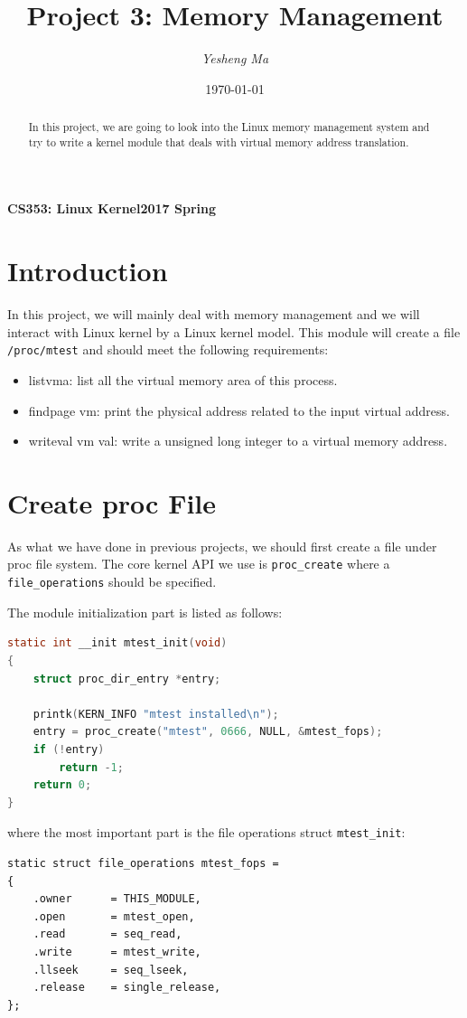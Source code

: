 \documentclass{article}
\begin{document}
\title{Project 3: Memory Management}
\author{\textit{Yesheng Ma}}
\date{\today}
{\bf\small CS353: Linux Kernel}\hfill{\bf\small 2017 Spring}
{\let\newpage\relax\maketitle}
\maketitle


\begin{abstract}
In this project, we are going to look into the Linux memory management system and try to write a kernel module that deals with virtual memory address translation.
\end{abstract}


\section{Introduction}
In this project, we will mainly deal with memory management and we will interact with Linux kernel by a Linux kernel model. This module will create a file \texttt{/proc/mtest} and should meet the following requirements:
\begin{itemize}
\item listvma: list all the virtual memory area of this process.
\item findpage vm: print the physical address related to the input virtual address.
\item writeval vm val: write a unsigned long integer to a virtual memory address.
\end{itemize}

\section{Create proc File}
As what we have done in previous projects, we should first create a file under proc file system. The core kernel API we use is \verb|proc_create| where a \texttt{file\_operations} should be specified.

The module initialization part is listed as follows:
\begin{lstlisting}[language=C]
static int __init mtest_init(void)
{
	struct proc_dir_entry *entry;

	printk(KERN_INFO "mtest installed\n");
	entry = proc_create("mtest", 0666, NULL, &mtest_fops);
	if (!entry)
		return -1;
	return 0;
}
\end{lstlisting}
where the most important part is the file operations struct \verb|mtest_init|:
\begin{lstlisting}
static struct file_operations mtest_fops =
{
	.owner		= THIS_MODULE,
	.open		= mtest_open,
	.read		= seq_read,
	.write		= mtest_write,
	.llseek		= seq_lseek,
	.release	= single_release,
};
\end{lstlisting}
\end{document}
